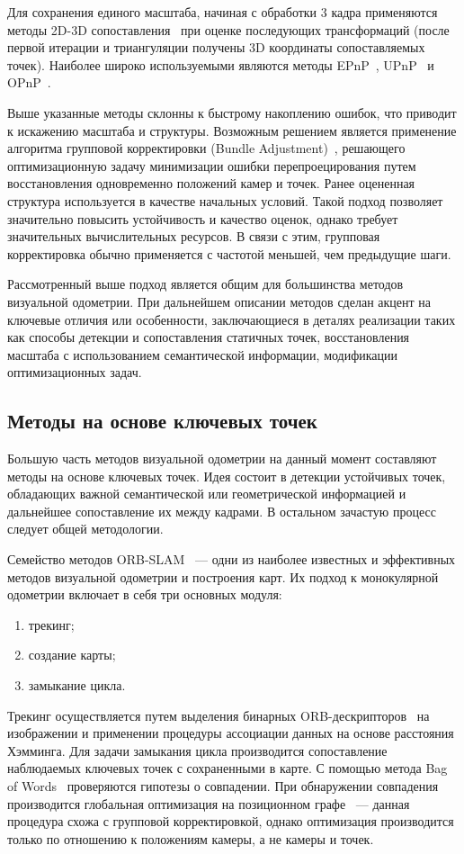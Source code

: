 Для сохранения единого масштаба, начиная с обработки 3 кадра применяются методы 2D-3D 
сопоставления~\cite{li2012robust} при оценке последующих трансформаций (после первой итерации и триангуляции получены
3D координаты сопоставляемых точек). Наиболее широко используемыми являются методы 
EPnP~\cite{lepetit2009ep}, UPnP~\cite{kneip2014upnp} и OPnP~\cite{zheng2013revisiting}. 

Выше указанные методы склонны к быстрому накоплению ошибок, что приводит к искажению 
масштаба и структуры. Возможным решением является применение алгоритма групповой корректировки
(Bundle Adjustment)~\cite{triggs2000bundle}, решающего оптимизационную задачу минимизации ошибки перепроецирования 
путем восстановления одновременно положений камер и точек. Ранее оцененная структура
используется в качестве начальных условий. Такой подход позволяет значительно повысить
устойчивость и качество оценок, однако требует значительных вычислительных ресурсов. 
В связи с этим, групповая корректировка обычно применяется с частотой меньшей, чем предыдущие
шаги.

Рассмотренный выше подход является общим для большинства методов визуальной одометрии. 
При дальнейшем описании методов
сделан акцент на ключевые отличия или особенности, заключающиеся в 
деталях реализации таких как способы детекции и сопоставления статичных точек, 
восстановления масштаба с использованием семантической информации, модификации 
оптимизационных задач.

\subsection{Методы на основе ключевых точек}
Большую часть методов визуальной одометрии на данный момент составляют методы на 
основе ключевых точек. Идея состоит в детекции устойчивых точек, обладающих важной 
семантической или геометрической информацией и дальнейшее сопоставление их 
между кадрами. В остальном зачастую процесс следует общей методологии. 

Семейство методов ORB-SLAM~\cite{mur2015orb}\cite{mur2017orb}\cite{campos2021orb} --- 
одни из наиболее известных и эффективных методов визуальной 
одометрии и построения карт. Их подход к монокулярной одометрии включает в себя три основных модуля: 
\begin{enumerate}
    \item трекинг;
    \item создание карты;
    \item замыкание цикла.
\end{enumerate}
Трекинг осуществляется путем выделения бинарных ORB-дескрипторов~\cite{rublee2011orb} на изображении и применении 
процедуры ассоциации данных на основе расстояния Хэмминга. Для задачи замыкания
цикла производится сопоставление наблюдаемых ключевых точек с сохраненными в карте.
С помощью метода Bag of Words~\cite{qader2019overview} проверяются гипотезы о совпадении. При обнаружении совпадения
производится глобальная оптимизация на позиционном графе~\cite{kummerle2011g} --- данная процедура схожа с 
групповой корректировкой, однако оптимизация производится только по отношению к
положениям камеры, а не камеры и точек.

